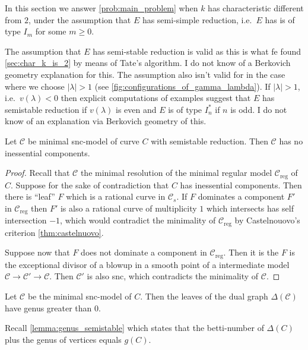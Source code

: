In this section we answer \cref{prob:main_problem} when $k$ has characteristic different from $2$, under the assumption that $E$ has semi-simple reduction, i.e.\  $E$ has is of type $I_m$ for some $m \ge 0$. 

\begin{remark}
	The assumption that $E$ has semi-stable reduction is valid as this is what fe found \cref{sec:char_k_is_2} by means of Tate's algorithm. 
	I do not know of a Berkovich geometry explanation for this.  
	The assumption also isn't valid for in the case where we choose $|\lambda| > 1$ (see \cref{fig:configurations_of_gamma_lambda}).
	If $|\lambda| > 1$, i.e.\ $v(\lambda) < 0$ then
	explicit computations of examples suggest that  $E$ has semistable reduction if $v(\lambda)$ is even and $E$ is of type $I^*_n$ if $n$ is odd. 
	I do not know of an explanation via Berkovich geometry of this. 
\end{remark}

\begin{lemma}\label{lem:semistable_skeleton}
	Let $\mathscr C$ be minimal snc-model of curve $C$ with semistable reduction.
	Then $\mathscr C$ has no inessential components. 
\end{lemma}
\begin{proof}
	Recall that $\mathscr C$ the minimal resolution of the minimal regular model $\mathscr C_\text{reg} $ of $C$. 
	Suppose for the sake of contradiction that  $C$ has inessential components.
	Then there is ``leaf''  $F$ which is a rational curve in $\mathscr C_s$. 
	If $F$ dominates a component $F'$ in $\mathscr C_\text{reg} $ then $F'$ is also a rational curve of multiplicity $1$ which intersects has self intersection $-1$,  which would contradict the minimality of  $\mathscr C _\text{reg} $ by Castelnouovo's criterion \cref{thm:castelnuovo}. 

	Suppose now that $F$ does not dominate a component in $\mathscr C_\text{reg} $.
	Then it is the $F$ is the exceptional divisor of a blowup in a smooth point of a intermediate model $\mathscr C \to \mathscr C' \to \mathscr C$. 
	Then $\mathscr C'$ is also snc, which contradicts the minimality of $\mathscr C$. 
\end{proof}
\begin{corollary}
	Let $\mathscr C$ be the minimal snc-model of $C$. 
	Then the leaves of the dual graph  $\Delta (\mathscr C)$ have genus greater than $0$. 
\end{corollary}

Recall \cref{lemma:genus_semistable} which states that the betti-number of $\Delta(C)$ plus the genus of vertices equals $g(C)$. 

